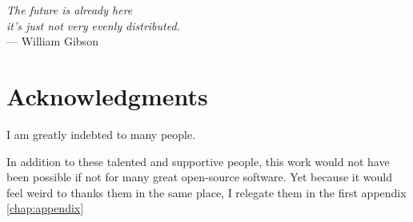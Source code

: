 
\begin{flushright}{\slshape    
		The future is already here \\
		it's just not very evenly distributed.
    } \\ \medskip
    --- William Gibson
\end{flushright}

\bigskip

\begingroup
\let\clearpage\relax
\let\cleardoublepage\relax
\let\cleardoublepage\relax
\chapter*{Acknowledgments}

I am greatly indebted to many people.

In addition to these talented and supportive people, this work would not have
been possible if not for many great open-source software. Yet because it would
feel weird to thanks them in the same place, I relegate them in the first
appendix \autoref{chap:appendix}

\endgroup



